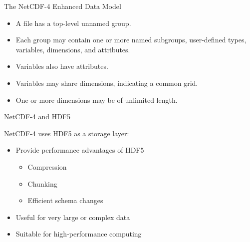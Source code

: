 \documentclass[compress,11pt,xcolor=svgnames,aspectratio=169]{beamer}
\begin{document}
\begin{frame}[t]{The NetCDF-4 Enhanced Data Model}

    \begin{itemize}
    \setlength\itemsep{0.5cm}
        \item A file has a top-level unnamed group.
        \item Each group may contain one or more named subgroups, user-defined types, variables, dimensions, and attributes.
        \item Variables also have attributes.
        \item Variables may share dimensions, indicating a common grid.
        \item One or more dimensions may be of unlimited length.
    \end{itemize}

\nocite{netcdf}

\end{frame}

\begin{frame}[t]{NetCDF-4 and HDF5}

NetCDF-4 uses HDF5 as a storage layer:

\begin{itemize}
\setlength\itemsep{0.6cm}

    \item Provide performance advantages of HDF5
      \begin{itemize}
        \item Compression
        \item Chunking
        \item Efficient schema changes
      \end{itemize}
    \item Useful for very large or complex data
    \item Suitable for high-performance computing

    \nocite{netcdf}

\end{itemize}

\end{frame}
\end{document}
